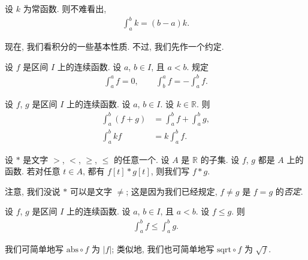 \begin{example}
    设 $k$ 为常函数. 则不难看出,
    \begin{align*}
        \int_{a}^{b} {k} = (b - a)k.
    \end{align*}
\end{example}

现在, 我们看积分的一些基本性质. 不过, 我们先作一个约定.

\begin{definition}
    设 $f$ 是区间 $I$ 上的连续函数. 设 $a$, $b \in I$, 且 $a < b$. 规定
    \begin{align*}
        \int_{a}^{a} {f} = 0, \qquad \int_{b}^{a} {f} = -\int_{a}^{b} {f}.
    \end{align*}
\end{definition}

\begin{theorem}
    设 $f$, $g$ 是区间 $I$ 上的连续函数. 设 $a$, $b \in I$. 设 $k \in \mathbb{R}$. 则
    \begin{align*}
        \int_{a}^{b} {(f + g)} & = \int_{a}^{b} {f} + \int_{a}^{b} {g}, \\
        \int_{a}^{b} {kf}      & = k \int_{a}^{b} {f}.
    \end{align*}
\end{theorem}

\begin{definition}
    设 $\ast$ 是文字 $>$, $<$, $\geq$, $\leq$ 的任意一个. 设 $A$ 是 $\mathbb{R}$ 的子集. 设 $f$, $g$ 都是 $A$ 上的函数. 若对任意 $t \in A$, 都有 $f[t] \ast g[t]$, 则我们写 $f \ast g$.
\end{definition}

\begin{remark}
    注意, 我们没说 $\ast$ 可以是文字 $\neq$; 这是因为我们已经规定, $f \neq g$ 是 $f = g$ 的\emph{否定}.
\end{remark}

\begin{theorem}
    设 $f$, $g$ 是区间 $I$ 上的连续函数. 设 $a$, $b \in I$, 且 $a < b$. 设 $f \leq g$. 则
    \begin{align*}
        \int_{a}^{b} {f} \leq \int_{a}^{b} {g}.
    \end{align*}
\end{theorem}

\begin{definition}
    我们可简单地写 $\mathrm{abs} \circ f$ 为 $|f|$; 类似地, 我们也可简单地写 $\mathrm{sqrt} \circ f$ 为 $\sqrt{f}$.
\end{definition}

